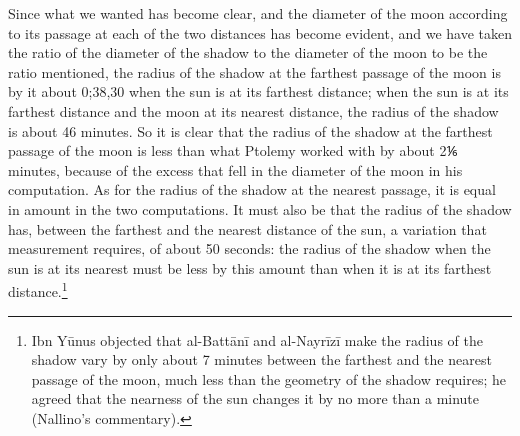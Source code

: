 \documentclass[11pt]{article}
\newcommand{\ArPage}[1]{\marginpar{\footnotesize\color{gray}Ar.\,p.\,#1}}
\begin{document}
\par \ArPage{88}Since what we wanted has become clear, and the diameter of the moon according to its passage at each of the two distances has become evident, and we have taken the ratio of the diameter of the shadow to the diameter of the moon to be the ratio mentioned, the radius of the shadow at the farthest passage of the moon is by it about 0;38,30 when the sun is at its farthest distance; when the sun is at its farthest distance and the moon at its nearest distance, the radius of the shadow is about 46 minutes. So it is clear that the radius of the shadow at the farthest passage of the moon is less than what Ptolemy worked with by about 2⅙ minutes, because of the excess that fell in the diameter of the moon in his computation. As for the radius of the shadow at the nearest passage, it is equal in amount in the two computations. It must also be that the radius of the shadow has, between the farthest and the nearest distance of the sun, a variation that measurement requires, of about 50 seconds: the radius of the shadow when the sun is at its nearest must be less by this amount than when it is at its farthest distance.\footnote{Ibn Yūnus objected that al-Battānī and al-Nayrīzī make the radius of the shadow vary by only about 7 minutes between the farthest and the nearest passage of the moon, much less than the geometry of the shadow requires; he agreed that the nearness of the sun changes it by no more than a minute (Nallino's commentary).}\par
\end{document}
